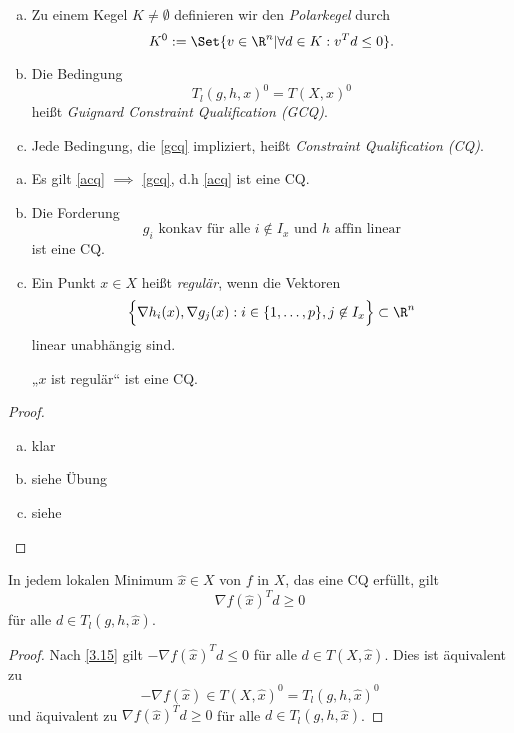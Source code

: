 \begin{df} \label{3.20}
	\begin{enumerate}[(a)]
		\item
			Zu einem Kegel $K \neq \emptyset$ definieren wir den \emph{Polarkegel} durch
			\[
				K^0 := \Set{ v \in \R^n | \forall d \in K : v^T d \le 0 }.
			\]
		\item
			Die Bedingung
			\begin{equation} \label{gcq} \tag{GCQ}
				T_l(g,h,x)^0 = T(X,x)^0
			\end{equation}
			heißt \emph{Guignard Constraint Qualification (GCQ)}.
		\item
			Jede Bedingung, die \eqref{gcq} impliziert, heißt \emph{Constraint Qualification (CQ)}.
	\end{enumerate}
\end{df}

\begin{ex} \label{3.21}
	\begin{enumerate}[(a)]
		\item
			Es gilt \eqref{acq} $\implies$ \eqref{gcq}, d.h \eqref{acq} ist eine CQ.
		\item
			Die Forderung
			\[
				\text{$g_i$ konkav für alle $i \not\in I_x$ und $h$ affin linear}
			\]
			ist eine CQ.
		\item
			Ein Punkt $x \in X$ heißt \emph{regulär}, wenn die Vektoren
			\[
				\Big\{ \nabla h_i(x), \nabla g_j(x) : i \in \{1, \dotsc, p\}, j \not\in I_x \Big\} \subset \R^n
			\]
			linear unabhängig sind.

			„$x$ ist regulär“ ist eine CQ.
	\end{enumerate}
	\begin{proof}
		\begin{enumerate}[(a)]
			\item
				klar
			\item
				siehe Übung
			\item
				siehe \cite[16.2]{ulbrich12}
		\end{enumerate}
	\end{proof}
\end{ex}

\begin{st} \label{3.22}
	In jedem lokalen Minimum $\hat x \in X$ von $f$ in $X$, das eine CQ erfüllt, gilt
	\[
		\nabla f(\hat x)^T d \ge 0
	\]
	für alle $d \in T_l(g,h,\hat x)$.
	\begin{proof}
		Nach \ref{3.15} gilt $-\nabla f(\hat x)^T d \le 0$ für alle $d \in T(X, \hat x)$.
		Dies ist äquivalent zu
		\[
			-\nabla f(\hat x) \in T(X,\hat x)^0 = T_l (g,h,\hat x)^0
		\]
		und äquivalent zu $\nabla f(\hat x)^T d \ge 0$ für alle $d \in T_l(g, h, \hat x)$.
	\end{proof}
\end{st}

